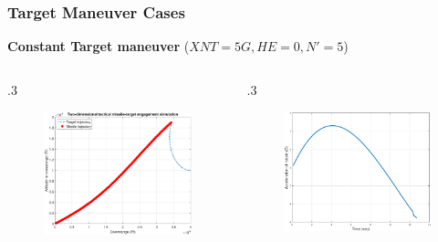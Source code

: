 \documentclass{beamer}
\begin{document}
\begin{frame}
\frametitle{Target Maneuver Cases}
\textbf{ Constant Target maneuver} ($XNT=5G , HE=0 , N'=5$)

\begin{columns}[c]
	\begin{column} {.3\linewidth}
		\begin{figure}[htb]
			\centering
			\includegraphics[scale = 0.18]{fig/trajectoryXNT5HE0N5.pdf}
		\end{figure}
	\end{column}
	
	\begin{column} {.3\linewidth}
		\begin{figure}[htb]
			\centering
			\includegraphics[scale = 0.18]{fig/MissileAccelerationXNT5HE0N5.pdf}
		\end{figure}
	\end{column}
	

\end{columns}
\end{frame}
\end{document}
